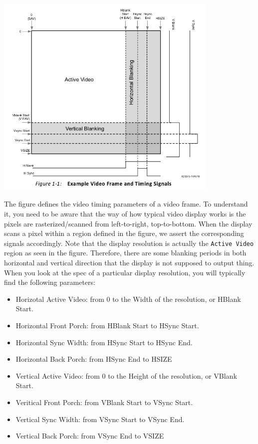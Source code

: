 \documentclass[11pt]{article}
\begin{document}
\begin{center}
\includegraphics[width=0.8\textwidth]{figs/video_timings.png}
\end{center}

The figure defines the video timing parameters of a video frame. To understand it, you need to be aware that the way of how typical video display works is the pixels are rasterized/scanned from left-to-right, top-to-bottom. When the display scans a pixel within a region defined in the figure, we assert the corresponding signals accordingly. Note that the display resolution is actually the \verb|Active Video| region as seen in the figure. Therefore, there are some blanking periods in both horizontal and vertical direction that the display is not supposed to output thing. When you look at the spec of a particular display resolution, you will typically find the following parameters:

\begin{itemize}
  \item Horizotal Active Video: from 0 to the Width of the resolution, or HBlank Start.
  \item Horizontal Front Porch: from HBlank Start to HSync Start.
  \item Horizontal Sync Width: from HSync Start to HSync End.
  \item Horizontal Back Porch: from HSync End to HSIZE
  \item Vertical Active Video: from 0 to the Height of the resolution, or VBlank Start.
  \item Veritical Front Porch: from VBlank Start to VSync Start.
  \item Vertical Sync Width: from VSync Start to VSync End.
  \item Vertical Back Porch: from VSync End to VSIZE
\end{itemize}
\end{document}
